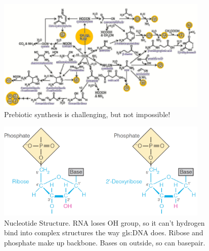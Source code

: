 \documentclass[]{article}
\begin{document}
\begin{figure}[H]
	\caption{Prebiotic synthesis is challenging, but not impossible!}\label{fig:PrebioticSynthesis} 
	\includegraphics[width=0.9\textwidth]{PrebioticSynthesis}
\end{figure}

\begin{figure}[H]
	\caption[Nucleotide Structure]{Nucleotide Structure. RNA loses OH group, so it can't hydrogen bind into complex structures the way \gls{gls:DNA} does. Ribose and phosphate make up backbone. Bases on outside, so can basepair.}\label{fig:NucleotideStructure} 
	\includegraphics[width=0.9\textwidth]{NucleotideStructure}
\end{figure}
\end{document}
